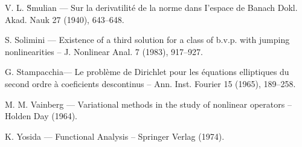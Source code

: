 \begin{thebibliography}{}
 V. L. \u{S}mulian --- Sur la derivatilit\'e de la
  norme dans I'espace de Banach Dokl. Akad. Nauk 27 (1940), 643--648.

 S. Solimini --- Existence of a third solution for a
  class of b.v.p. with jumping nonlinearities -- J. Nonlinear Anal. 7
  (1983), 917--927.

 G. Stampacchia\pageoriginale --- Le probl\`eme de
  Dirichlet pour les \'equations elliptiques du second ordre \`a
  coeficients descontinus -- Ann. Inst. Fourier 15 (1965), 189--258.

 M. M. Vainberg --- Variational methods in the study of
  nonlinear operators -- Holden Day (1964).

 K. Yosida --- Functional Analysis -- Springer Verlag (1974).

\end{thebibliography}
